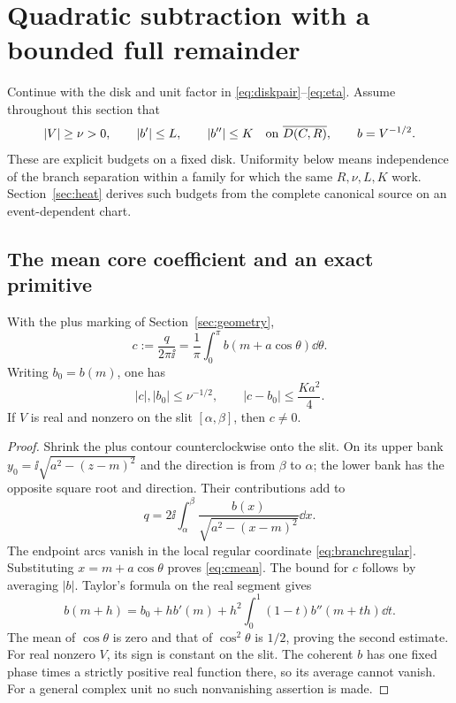 \section{Quadratic subtraction with a bounded full remainder}\label{sec:remainders}

Continue with the disk and unit factor in \eqref{eq:diskpair}--\eqref{eq:eta}.
Assume throughout this section that
\begin{equation}\label{eq:unitbudgets}
 |V|\ge\nu>0,\qquad |b'|\le L,\qquad |b''|\le K
 \quad\hbox{on }\overline{D(C,R)},\qquad b=V^{-1/2}.
\end{equation}
These are explicit budgets on a fixed disk. Uniformity below means
independence of the branch separation within a family for which the same
$R,\nu,L,K$ work. Section~\ref{sec:heat} derives such budgets from the
complete canonical source on an event-dependent chart.

\subsection{The mean core coefficient and an exact primitive}
\begin{lemma}\label{lem:coremean}
With the plus marking of Section~\ref{sec:geometry},
\begin{equation}\label{eq:cmean}
 c:=\frac{q}{2\pi\ii}
   =\frac1\pi\int_0^\pi b(m+a\cos\theta)\dd\theta.
\end{equation}
Writing $b_0=b(m)$, one has
\begin{equation}\label{eq:cerror}
 |c|,|b_0|\le\nu^{-1/2},\qquad |c-b_0|\le\frac{Ka^2}{4}.
\end{equation}
If $V$ is real and nonzero on the slit $[\alpha,\beta]$, then $c\ne0$.
\end{lemma}
\begin{proof}
Shrink the plus contour counterclockwise onto the slit. On its upper
bank $y_0=\ii\sqrt{a^2-(z-m)^2}$ and the direction is from $\beta$
to $\alpha$; the lower bank has the opposite square root and direction.
Their contributions add to
\[
 q=2\ii\int_\alpha^\beta
       \frac{b(x)}{\sqrt{a^2-(x-m)^2}}\dd x.
\]
The endpoint arcs vanish in the local regular coordinate
\eqref{eq:branchregular}. Substituting $x=m+a\cos\theta$ proves
\eqref{eq:cmean}. The bound for $c$ follows by averaging $|b|$.
Taylor's formula on the real segment gives
\[
 b(m+h)=b_0+h b'(m)+h^2\int_0^1(1-t)b''(m+th)\dd t.
\]
The mean of $\cos\theta$ is zero and that of $\cos^2\theta$ is $1/2$,
proving the second estimate. For real nonzero $V$, its sign is constant
on the slit. The coherent $b$ has one fixed phase times a strictly
positive real function there, so its average cannot vanish. For a general
complex unit no such nonvanishing assertion is made.
\end{proof}

